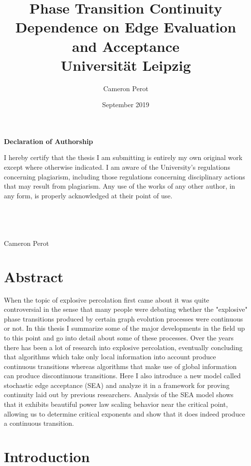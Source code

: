 \documentclass[12pt,twoside]{report}
\title{
    {Phase Transition Continuity Dependence on Edge Evaluation and Acceptance}\\
    {\large Universität Leipzig}
    }
\author{Cameron Perot}
\date{September 2019}
\begin{document}
\maketitle
{}


\begin{center}
\bf{Declaration of Authorship}
\end{center}

I hereby certify that the thesis I am submitting is entirely my own original work except where otherwise indicated. I am aware of the University's regulations concerning plagiarism, including those regulations concerning disciplinary actions that may result from plagiarism. Any use of the works of any other author, in any form, is properly acknowledged at their point of use.
\\\\\\\\\\

\noindent Cameron Perot

\chapter*{Abstract}
When the topic of explosive percolation first came about it was quite controversial in the sense that many people were debating whether the "explosive" phase transitions produced by certain graph evolution processes were continuous or not.
In this thesis I summarize some of the major developments in the field up to this point and go into detail about some of these processes.
Over the years there has been a lot of research into explosive percolation, eventually concluding that algorithms which take only local information into account produce continuous transitions whereas algorithms that make use of global information can produce discontinuous transitions.
Here I also introduce a new model called stochastic edge acceptance (SEA) and analyze it in a framework for proving continuity laid out by previous researchers.
Analysis of the SEA model shows that it exhibits beautiful power law scaling behavior near the critical point, allowing us to determine critical exponents and show that it does indeed produce a continuous transition.


\tableofcontents
\cleardoublepage
{}

\chapter{Introduction}
\label{ch:introduction}

\end{document}
